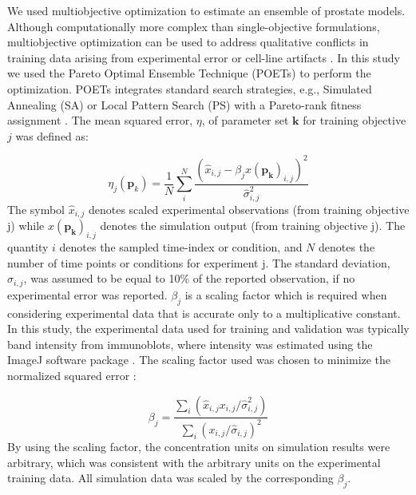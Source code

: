\documentclass[12pt]{article}
\begin{document}
We used multiobjective optimization to estimate an ensemble of prostate models. Although computationally more complex than single-objective formulations, multiobjective optimization can be used to address qualitative conflicts in training data arising from experimental error or cell-line artifacts \cite{Handl2007}. In this study we used the Pareto Optimal Ensemble Technique (POETs) to perform the optimization. POETs integrates standard search strategies, e.g., Simulated Annealing (SA) or Local Pattern Search (PS) with a Pareto-rank fitness assignment \cite{Song2010}. The mean squared error, $\eta$, of parameter set $\mathbf{k}$ for training objective $j$ was defined as:    

\begin{equation}
\eta_j(\mathbf{p}_k) = \frac{1}{N}\sum_{i}^{N}\frac{(\hat{x}_{i,j} - \beta_j x(\mathbf{p_k})_{i,j})^2}{\hat{\sigma}^2_{i,j}}
\end{equation}
The symbol $\hat{x}_{i,j}$ denotes scaled experimental observations (from training objective j) while $x(\mathbf{p_k})_{i,j}$ denotes the simulation output (from training objective j). The quantity $i$ denotes the sampled time-index or condition, and $N$ denotes the number of time points or conditions for experiment j. The standard deviation, $\hat{\sigma}_{i,j}$, was assumed to be equal to 10\% of the reported observation, if no experimental error was reported. $\beta_j$ is a scaling factor which is required when considering experimental data that is accurate only to a multiplicative constant. In this study, the experimental data used for training and validation was typically band intensity from immunoblots, where intensity was estimated using the ImageJ software package \cite{Abramoff2004}. The scaling factor used was chosen to minimize the normalized squared error \cite{Brown2003}:

\begin{equation}
\beta_j = \frac{\sum_{i}(\hat{x}_{i,j}x_{i,j}/\hat{\sigma}_{i,j}^2)}{\sum_{i}(x_{i,j}/\hat{\sigma}_{i,j})^2}
\end{equation} 
By using the scaling factor, the concentration units on simulation results were arbitrary, which was consistent with the arbitrary units on the experimental training data. All simulation data was scaled by the corresponding $\beta_j$. 
\end{document}
